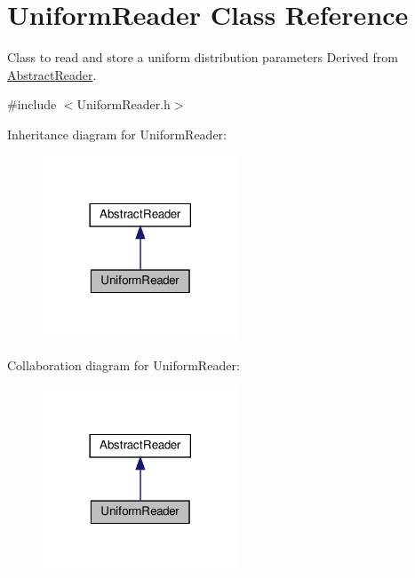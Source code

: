 \hypertarget{classUniformReader}{}\section{Uniform\+Reader Class Reference}
\label{classUniformReader}


Class to read and store a uniform distribution parameters Derived from \hyperlink{classAbstractReader}{Abstract\+Reader}.  




{\ttfamily \#include $<$Uniform\+Reader.\+h$>$}



Inheritance diagram for Uniform\+Reader\+:\nopagebreak
\begin{figure}[H]
\begin{center}
\leavevmode
\includegraphics[width=165pt]{classUniformReader__inherit__graph}
\end{center}
\end{figure}


Collaboration diagram for Uniform\+Reader\+:\nopagebreak
\begin{figure}[H]
\begin{center}
\leavevmode
\includegraphics[width=165pt]{classUniformReader__coll__graph}
\end{center}
\end{figure}
